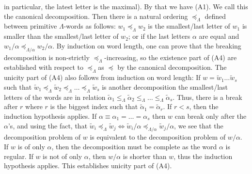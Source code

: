 \documentclass[11pt,a4paper]{amsart}
\theoremstyle{definition}
\theoremstyle{plain}
\begin{document}
 in particular, the latest letter is the maximal).
By that we have (A1).
We call this the canonical decomposition.
Then there is a natural ordering $\preccurlyeq_\Lambda$ defined between primitive $\Lambda$-words as follows:
 $w_1\preccurlyeq_\Lambda w_2$ is the smallest/last letter of $w_1$ is smaller than  the smallest/last letter of $w_2$;
 or if the last letters $\alpha$ are equal and $w_1/\alpha\preccurlyeq_{\Lambda/\alpha} w_2/\alpha$.
By induction on word length, one can prove that the breaking decomposition is non-strictly
 $\preccurlyeq_\Lambda$-increasing, so the  existence part of (A4) are established
 with respect to $ \preccurlyeq_\Lambda$as $\preccurlyeq $ by the canonical decomposition.
The unicity part of (A4) also follows from induction on word length:
If $w=\tilde w_1\ldots\tilde  w_s$ such that
 $\tilde w_1  \preccurlyeq_\Lambda \tilde w_2 \preccurlyeq_\Lambda\ldots\preccurlyeq_\Lambda \tilde w_s$
 is another decomposition the smallest/last letters of the words are in relation
 $\tilde\alpha_1\leq_\Lambda\tilde\alpha_2\leq_\Lambda \ldots\leq_\Lambda\tilde\alpha_s$.
Thus, there is a break after $r$ where $r$ is the biggest index such that $\tilde\alpha_1=\tilde \alpha_r$.
If $r<s$, then the induction hypothesis applies.
If $\alpha\equiv \alpha_1=\ldots=\alpha_s$
 then $w$ can break only after the $\alpha$'s, and using the fact, that $\tilde w_i \preccurlyeq_\Lambda \tilde w_j
 \Leftrightarrow \tilde w_i/\alpha \preccurlyeq_{\Lambda/\alpha} \tilde w_j/\alpha$, we see that the decomposition problem of $w$
 is equivalent to the decomposition problem of $w/\alpha$.
If $w$ is   of only $\alpha$, then the decomposition must be complete as the word $\alpha$ is regular.
If $w$ is not of only $\alpha$, then $w/\alpha$ is shorter than $w$, thus the induction hypothesis applies.
This establishes unicity part of (A4).
\end{document}
